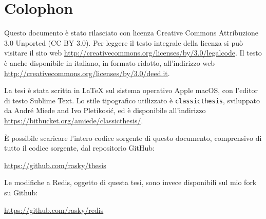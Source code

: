\pagestyle{empty}

\hfill

\vfill


\section*{Colophon}

Questo documento è stato rilasciato con licenza Creative Commons Attribuzione
3.0 Unported (CC BY 3.0). Per leggere il testo integrale della licenza si può
visitare il sito web \url{http://creativecommons.org/licenses/by/3.0/legalcode}. 
Il testo è anche disponibile in italiano, in formato ridotto, all'indirizzo web
\url{http://creativecommons.org/licenses/by/3.0/deed.it}.

La tesi è stata scritta in \LaTeX{} sul sistema operativo Apple macOS, con
l'editor di testo Sublime Text. Lo stile tipografico utilizzato è \texttt{classicthesis},
sviluppato da Andr\'e Miede and Ivo Pletikosić, ed è disponibile all'indirizzo
\url{https://bitbucket.org/amiede/classicthesis/}.

È possibile scaricare l'intero codice sorgente di questo documento, comprensivo 
di tutto il codice sorgente, dal repositorio GitHub:
\begin{center}
\url{https://github.com/rasky/thesis}
\end{center}

Le modifiche a Redis, oggetto di questa tesi, sono invece disponibili sul mio 
fork su Github:
\begin{center}
\url{https://github.com/rasky/redis}
\end{center}

\bigskip

\noindent\finalVersionString


